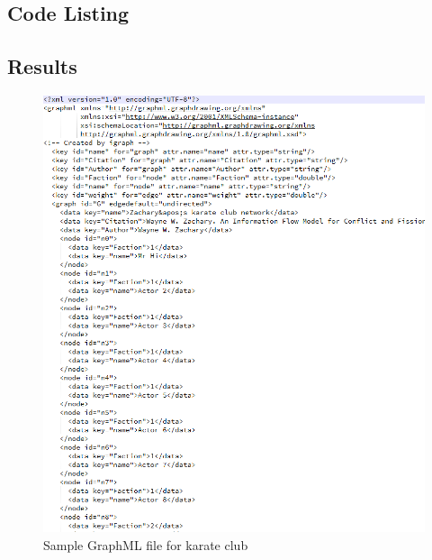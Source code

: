 
\newpage

\subsection{Code Listing}


\newpage

\subsection{Results}

\begin{figure}[ht]    
    \begin{center}
        \includegraphics[scale=0.7]{q3_sample_graphml.png}
        \caption{Sample GraphML file for karate club}
        \label{Sample3_t1}
    \end{center}
\end{figure}
\newpage
